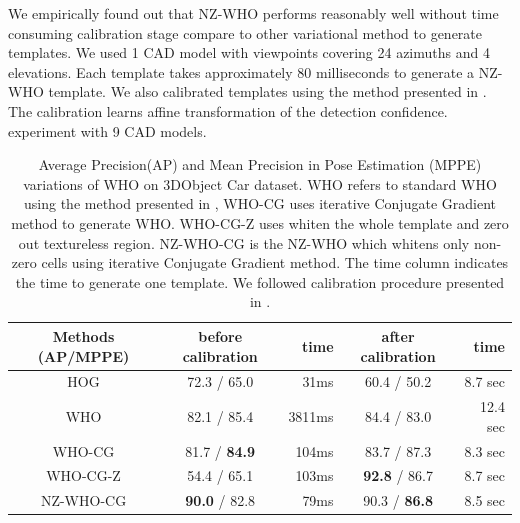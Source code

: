 \documentclass[10pt,twocolumn,letterpaper]{article}
\begin{document}
We empirically found out that NZ-WHO performs reasonably well without time
consuming calibration stage compare to other variational method to generate
templates. We used 1 CAD model with viewpoints covering 24 azimuths and 4
elevations. Each template takes approximately 80 milliseconds to generate a
NZ-WHO template. We also calibrated templates using the method presented in
\cite{Aubry14}. The calibration learns affine transformation of the detection
confidence.%
experiment with 9 CAD models.


\begin{table}[!htbp]
    \footnotesize
    \begin{center}
\begin{tabular}{|c|c|r|c|r|}
\hline
Methods (AP/MPPE) & before calibration  & time & after calibration \cite{Aubry14} & time \\
\hline\hline
HOG\cite{Dalal05}     & 72.3 / 65.0           &  31ms  & 60.4 / 50.2                 & 8.7 sec \\ 
WHO\cite{Hariharan12} & 82.1 / 85.4           &  3811ms& 84.4 / 83.0                 & 12.4 sec  \\
WHO-CG                & 81.7 / \textbf{84.9}  &  104ms & 83.7 / 87.3                 & 8.3 sec \\
WHO-CG-Z              & 54.4 / 65.1           &  103ms & \textbf{92.8} / 86.7        & 8.7 sec  \\
NZ-WHO-CG             & \textbf{90.0} / 82.8  &   79ms & 90.3 / \textbf{86.8}        & 8.5 sec   \\
\hline
\end{tabular}
\end{center}
\caption{Average Precision(AP) and Mean Precision in Pose Estimation (MPPE)
\cite{Lopez-Sastre11} variations of WHO on 3DObject Car
dataset\cite{Savarese07}. WHO refers to standard WHO using the method presented
in \cite{Hariharan12}, WHO-CG uses iterative Conjugate Gradient method to
generate WHO. WHO-CG-Z uses whiten the whole template and zero out textureless
region. NZ-WHO-CG is the NZ-WHO which whitens only non-zero cells using
iterative Conjugate Gradient method. The time column indicates the time to
generate one template. We followed calibration procedure presented in
\cite{Aubry14}.}
\label{tab:who_initializations}
\end{table}
\end{document}

